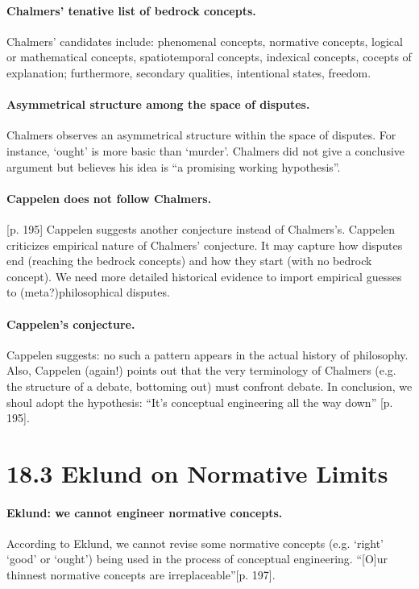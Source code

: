 \documentclass[
10pt, %
a4paper, %
twocolumn, %
landscape %
]{article}
\begin{document}
\paragraph{Chalmers' tenative list of bedrock concepts.}
Chalmers' candidates include: phenomenal concepts, normative concepts, logical or mathematical concepts,
spatiotemporal concepts, indexical concepts, cocepts of explanation; furthermore,
secondary qualities, intentional states, freedom.
\cite[p.552]{Chalmers2011}


\paragraph{Asymmetrical structure among the space of disputes.}
Chalmers observes an asymmetrical structure within the space of disputes. For instance, `ought' is more basic than `murder'.
Chalmers did not give a conclusive argument but believes his idea is ``a promising working hypothesis''.
\cite[p.548-549]{Chalmers2011}

\paragraph{Cappelen does not follow Chalmers.}
[p. 195]
Cappelen suggests another conjecture instead of Chalmers's.
Cappelen criticizes empirical nature of Chalmers' conjecture.
It may capture how disputes end (reaching the bedrock concepts) and how they start (with no bedrock concept).
We need more detailed historical evidence to import empirical guesses to (meta?)philosophical disputes.

\paragraph{Cappelen's conjecture. }
Cappelen suggests: no such a pattern appears in the actual history of philosophy.
Also, Cappelen (again!) points out that the very terminology of Chalmers (e.g. the structure of a debate, bottoming out) must confront debate. In conclusion, we shoul adopt the hypothesis: ``It's conceptual engineering all the way down'' [p. 195].

\section*{18.3 Eklund on Normative Limits}
\paragraph{Eklund: we cannot engineer normative concepts.}
According to Eklund, we cannot revise some normative concepts (e.g. `right' `good' or `ought') being used in the process of conceptual engineering.
``[O]ur thinnest normative concepts are irreplaceable''[p. 197].
\end{document}
